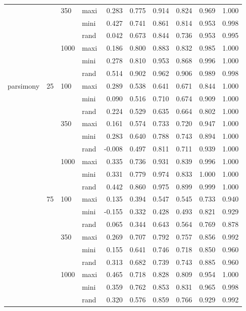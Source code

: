 \begin{table}[ht]
\begin{tabular}{llllrrrrrr}
   &  & 350 & maxi & 0.283 & 0.775 & 0.914 & 0.824 & 0.969 & 1.000 \\ 
   &  &  & mini & 0.427 & 0.741 & 0.861 & 0.814 & 0.953 & 0.998 \\ 
   &  &  & rand & 0.042 & 0.673 & 0.844 & 0.736 & 0.953 & 0.995 \\ 
   &  & 1000 & maxi & 0.186 & 0.800 & 0.883 & 0.832 & 0.985 & 1.000 \\ 
   &  &  & mini & 0.278 & 0.810 & 0.953 & 0.868 & 0.996 & 1.000 \\ 
   &  &  & rand & 0.514 & 0.902 & 0.962 & 0.906 & 0.989 & 0.998 \\ 
  parsimony & 25 & 100 & maxi & 0.289 & 0.538 & 0.641 & 0.671 & 0.844 & 1.000 \\ 
   &  &  & mini & 0.090 & 0.516 & 0.710 & 0.674 & 0.909 & 1.000 \\ 
   &  &  & rand & 0.224 & 0.529 & 0.635 & 0.664 & 0.802 & 1.000 \\ 
   &  & 350 & maxi & 0.161 & 0.574 & 0.733 & 0.720 & 0.947 & 1.000 \\ 
   &  &  & mini & 0.283 & 0.640 & 0.788 & 0.743 & 0.894 & 1.000 \\ 
   &  &  & rand & -0.008 & 0.497 & 0.811 & 0.711 & 0.939 & 1.000 \\ 
   &  & 1000 & maxi & 0.335 & 0.736 & 0.931 & 0.839 & 0.996 & 1.000 \\ 
   &  &  & mini & 0.331 & 0.779 & 0.974 & 0.833 & 1.000 & 1.000 \\ 
   &  &  & rand & 0.442 & 0.860 & 0.975 & 0.899 & 0.999 & 1.000 \\ 
   & 75 & 100 & maxi & 0.135 & 0.394 & 0.547 & 0.545 & 0.733 & 0.940 \\ 
   &  &  & mini & -0.155 & 0.332 & 0.428 & 0.493 & 0.821 & 0.929 \\ 
   &  &  & rand & 0.065 & 0.344 & 0.643 & 0.564 & 0.769 & 0.878 \\ 
   &  & 350 & maxi & 0.269 & 0.707 & 0.792 & 0.757 & 0.856 & 0.992 \\ 
   &  &  & mini & 0.155 & 0.641 & 0.746 & 0.718 & 0.850 & 0.960 \\ 
   &  &  & rand & 0.313 & 0.682 & 0.739 & 0.743 & 0.885 & 0.960 \\ 
   &  & 1000 & maxi & 0.465 & 0.718 & 0.828 & 0.809 & 0.954 & 1.000 \\ 
   &  &  & mini & 0.359 & 0.762 & 0.853 & 0.831 & 0.965 & 0.998 \\ 
   &  &  & rand & 0.320 & 0.576 & 0.859 & 0.766 & 0.929 & 0.992 \\ 

\end{tabular}
\end{table}
